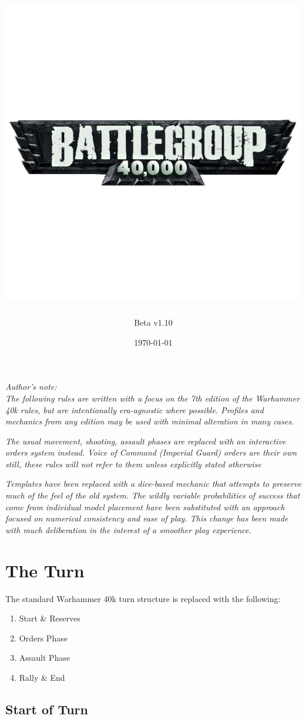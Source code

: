 \documentclass[letterpaper,twocolumn,oneside,titlepage]{book}
\title{
    \includegraphics[width=\textwidth]{img/style/bg40klogo.png}\\
}
\author{Beta v1.10}
\date{\today}
\providecommand{\tightlist}{%
  \setlength{\itemsep}{0pt}\setlength{\parskip}{0pt}}
\begin{document}
\frontmatter
\maketitle

{
\setcounter{tocdepth}{2}
\tableofcontents
\cleardoublepage
}
\mainmatter
\emph{Author's note:}\\
\emph{The following rules are written with a focus on the 7th edition of the 
Warhammer 40k rules, but are intentionally era-agnostic where possible. 
Profiles and mechanics from any edition
may be used with minimal alteration in many cases.}

\emph{The usual movement, shooting, assault phases are replaced with an
interactive orders system instead. Voice of Command (Imperial Guard)
orders are their own still, these rules will not refer to them unless
explicitly stated otherwise}

\emph{Templates have been replaced with a dice-based mechanic that attempts to preserve
much of the feel of the old system.
The wildly variable probabilities of success
that come from individual model placement have been substituted with an approach 
focused on numerical consistency and ease of play.
This change has been made with much deliberation in the interest of a 
smoother play experience.}

\chapter{\texorpdfstring{\textbf{The Turn}}{The Turn}}\label{the-turn}

The standard Warhammer 40k turn structure is replaced with the
following:

\begin{enumerate}
\def\labelenumi{\arabic{enumi}.}
\tightlist
\item
  Start \& Reserves\\
\item
  Orders Phase\\
\item
  Assault Phase\\
\item
  Rally \& End
\end{enumerate}

\section{\texorpdfstring{\textbf{Start of
Turn}}{Start of Turn}}\label{start-of-turn}
\end{document}
